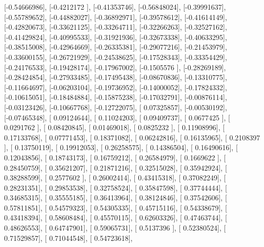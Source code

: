 \documentclass{article}
\begin{document}
       [-0.54666986],
       [-0.4212172 ],
       [-0.41353746],
       [-0.56848024],
       [-0.39991637],
       [-0.55789652],
       [-0.44882027],
       [-0.36892971],
       [-0.39578612],
       [-0.41614149],
       [-0.42820673],
       [-0.33621125],
       [-0.33264711],
       [-0.32266263],
       [-0.32527162],
       [-0.41429824],
       [-0.40995533],
       [-0.31921936],
       [-0.32673338],
       [-0.40633295],
       [-0.38515008],
       [-0.42964669],
       [-0.26335381],
       [-0.29077216],
       [-0.21453979],
       [-0.33600155],
       [-0.26721929],
       [-0.24538625],
       [-0.17528343],
       [-0.33354429],
       [-0.24176533],
       [-0.19428174],
       [-0.17967002],
       [-0.1505576 ],
       [-0.28269189],
       [-0.28424854],
       [-0.27933485],
       [-0.17495438],
       [-0.08670836],
       [-0.13310775],
       [-0.11664697],
       [-0.06203104],
       [-0.19736952],
       [-0.14000052],
       [-0.17824332],
       [-0.10615051],
       [-0.18484884],
       [-0.15875238],
       [-0.17032791],
       [-0.00876114],
       [-0.03123426],
       [-0.10667768],
       [-0.12722075],
       [ 0.07325857],
       [-0.00530192],
       [-0.07465348],
       [ 0.09124644],
       [ 0.11024203],
       [ 0.09409737],
       [ 0.0677425 ],
       [ 0.0291762 ],
       [ 0.08420845],
       [ 0.01469018],
       [ 0.0825232 ],
       [ 0.11908996],
       [ 0.17133768],
       [ 0.07771453],
       [ 0.18371082],
       [ 0.06242816],
       [ 0.16135965],
       [ 0.2108397 ],
       [ 0.13750119],
       [ 0.19912053],
       [ 0.26258575],
       [ 0.14386504],
       [ 0.16490616],
       [ 0.12043856],
       [ 0.18743173],
       [ 0.16759212],
       [ 0.26584979],
       [ 0.1669622 ],
       [ 0.28450759],
       [ 0.35621207],
       [ 0.21871216],
       [ 0.32515028],
       [ 0.35942924],
       [ 0.38288599],
       [ 0.2577602 ],
       [ 0.26002414],
       [ 0.43415318],
       [ 0.37082249],
       [ 0.28231351],
       [ 0.29853538],
       [ 0.32758524],
       [ 0.35847598],
       [ 0.37744444],
       [ 0.34685315],
       [ 0.35555185],
       [ 0.36413964],
       [ 0.38124846],
       [ 0.37542606],
       [ 0.57811851],
       [ 0.54579323],
       [ 0.54305335],
       [ 0.45715116],
       [ 0.54338679],
       [ 0.43418394],
       [ 0.58608484],
       [ 0.45570115],
       [ 0.62603326],
       [ 0.47463744],
       [ 0.48626553],
       [ 0.64747901],
       [ 0.59065731],
       [ 0.5137396 ],
       [ 0.52380524],
       [ 0.71529857],
       [ 0.71044548],
       [ 0.54723618],
\end{document}
